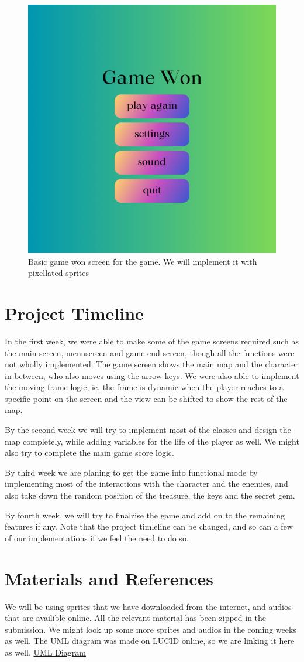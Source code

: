 \documentclass[12pt,a4paper]{article}
\begin{document}
\begin{figure}[htbp!]
\begin{center}
\includegraphics[width=0.5\columnwidth]{gamewon.png}
\end{center}
\caption{Basic game won screen for the game. We will implement it with pixellated sprites}
\label{fig:gamewon}
\end{figure}

\section{Project Timeline}\label{sec:Timeline}

In the first week, we were able to make some of the game screens required such as the main screen, menuscreen and game end screen, though all the functions were not wholly implemented. The game screen shows the main map and the character in between, who also moves using the arrow keys. We were also able to implement the moving frame logic, ie. the frame is dynamic when the player reaches to a specific point on the screen and the view can be shifted to show the rest of the map.

By the second week we will try to implement most of the classes and design the map completely, while adding variables for the life of the player as well. We might also try to complete the main game score logic.

By third week we are planing to get the game into functional mode by implementing most of the interactions with the character and the enemies, and also take down the random position of the treasure, the keys and the secret gem.

By fourth week, we will try to finalzise the game and add on to the remaining features if any. Note that the project timleline can be changed, and so can a few of our implementations if we feel the need to do so.

\section{Materials and References}\label{sec:References}

We will be using sprites that we have downloaded from the internet, and audios that are availible online. All the relevant material has been zipped in the submission. We might look up some more sprites and audios in the coming weeks as well.
The UML diagram was made on LUCID online, so we are linking it here as well.
\href{https://lucid.app/lucidchart/eebd1889-03d9-42c5-a1c6-9e129e79c21b/edit?viewport_loc=1611%2C-914%2C2270%2C1094%2C0_0&invitationId=inv_76e59cee-f25e-4bd6-b04e-aeb0cfabf7f4}{UML Diagram}
\end{document}
